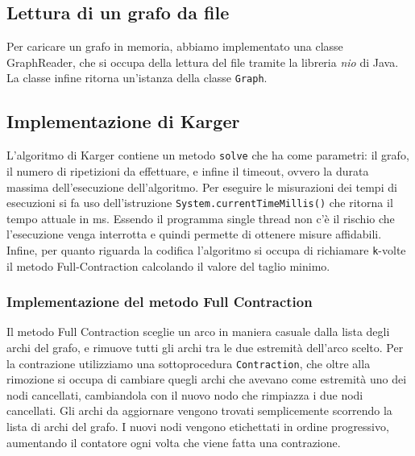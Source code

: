 \subsection{Lettura di un grafo da file}
Per caricare un grafo in memoria, abbiamo implementato una classe GraphReader,
che si occupa della lettura del file tramite la libreria \textit{nio} di Java.
La classe infine ritorna un'istanza della classe \texttt{Graph}.
\subsection{Implementazione di Karger}
L'algoritmo di Karger contiene un metodo \texttt{solve} che ha come parametri: il grafo,
il numero di ripetizioni da effettuare, e infine il timeout, ovvero la durata massima
dell'esecuzione dell'algoritmo.
Per eseguire le misurazioni dei tempi di esecuzioni si fa uso dell'istruzione
\texttt{System.currentTimeMillis()} che ritorna il tempo attuale in ms.
Essendo il programma single thread non c'è il rischio che l'esecuzione venga interrotta e
quindi permette di ottenere misure affidabili.
Infine, per quanto riguarda la codifica l'algoritmo si occupa di richiamare \texttt{k}-volte
il metodo Full-Contraction calcolando il valore del taglio minimo.
\subsubsection{Implementazione del metodo Full Contraction}
Il metodo Full Contraction sceglie un arco in maniera casuale dalla lista degli archi del grafo, e rimuove
tutti gli archi tra le due estremità dell'arco scelto. Per la contrazione utilizziamo una sottoprocedura \texttt{Contraction},
che oltre alla rimozione si occupa di cambiare quegli archi che avevano come estremità uno dei nodi cancellati, cambiandola
con il nuovo nodo che rimpiazza i due nodi cancellati. Gli archi da aggiornare vengono trovati semplicemente scorrendo la lista di archi del grafo. I nuovi nodi vengono etichettati in ordine progressivo,
aumentando il contatore ogni volta che viene fatta una contrazione.
